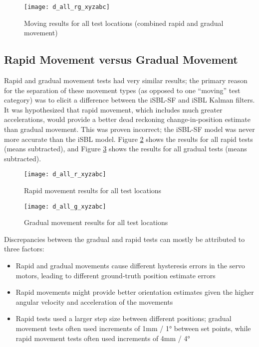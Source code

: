 \documentclass[12pt,a4paper]{report}
\begin{document}
\begin{figure}[htbp]
	\centering
	\texttt{[image: d\_all\_rg\_xyzabc]}
	\caption{Moving results for all test locations (combined rapid and gradual movement)}
	\label{fig:d_all_rg_xyzabc}
\end{figure}

\subsection{Rapid Movement versus Gradual Movement} \label{ssec:6s2s4}
Rapid and gradual movement tests had very similar results; the primary reason for the separation of these movement types (as opposed to one “moving” test category) was to elicit a difference between the iSBL-SF and iSBL Kalman filters. It was hypothesized that rapid movement, which includes much greater accelerations, would provide a better dead reckoning change-in-position estimate than gradual movement. This was proven incorrect; the iSBL-SF model was never more accurate than the iSBL model. Figure \ref{fig:d_all_r_xyzabc} shows the results for all rapid tests (means subtracted), and Figure \ref{fig:d_all_g_xyzabc} shows the results for all gradual tests (means subtracted). 

\begin{figure}[htbp]
	\centering
	\texttt{[image: d\_all\_r\_xyzabc]}
	\caption{Rapid movement results for all test locations}
	\label{fig:d_all_r_xyzabc}
\end{figure}

\begin{figure}[htbp]
	\centering
	\texttt{[image: d\_all\_g\_xyzabc]}
	\caption{Gradual movement results for all test locations}
	\label{fig:d_all_g_xyzabc}
\end{figure}

Discrepancies between the gradual and rapid tests can mostly be attributed to three factors: 
\begin{itemize}[noitemsep,topsep=0pt,]
	\item Rapid and gradual movements cause different hysteresis errors in the servo motors, leading to different ground-truth position estimate errors
	\item Rapid movements might provide better orientation estimates given the higher angular velocity and acceleration of the movements
	\item Rapid tests used a larger step size between different positions; gradual movement tests often used increments of 1mm / 1° between set points, while rapid movement tests often used increments of 4mm / 4°
\end{itemize}
\end{document}

